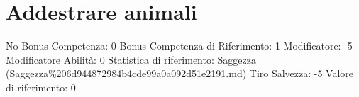 \section{Addestrare animali}\label{addestrare-animali}

\begin{description}
\tightlist
\item[Tags: ABI]
No Bonus Competenza: 0 Bonus Competenza di Riferimento: 1 Modificatore:
-5 Modificatore Abilità: 0 Statistica di riferimento: Saggezza
(Saggezza\%206d944872984b4cde99a0a092d51e2191.md) Tiro Salvezza: -5
Valore di riferimento: 0
\end{description}

